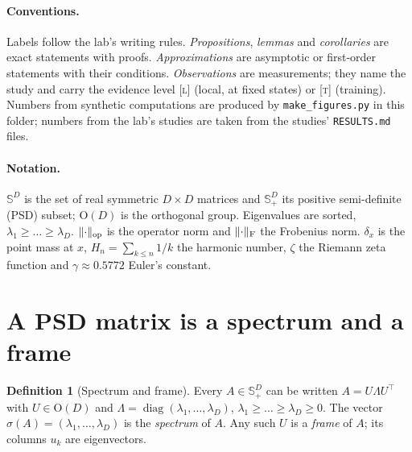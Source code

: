 \documentclass[11pt,a4paper]{article}
\newcommand{\Orth}{\mathrm{O}}
\newcommand{\Sym}{\mathbb{S}}
\DeclareMathOperator{\diag}{diag}
\DeclarePairedDelimiter{\norm}{\lVert}{\rVert}
\newcommand{\op}{\mathrm{op}}
\newcommand{\F}{\mathrm{F}}
\newcommand{\evL}{\textsc{[l]}}
\theoremstyle{plain}
\theoremstyle{definition}
\newtheorem{definition}[proposition]{Definition}
\theoremstyle{remark}
\begin{document}
\paragraph{Conventions.}
Labels follow the lab's writing rules. \emph{Propositions}, \emph{lemmas} and \emph{corollaries} are exact
statements with proofs. \emph{Approximations} are asymptotic or first-order statements with their conditions.
\emph{Observations} are measurements; they name the study and carry the evidence level \evL{} (local, at fixed
states) or \textsc{[t]} (training). Numbers from synthetic computations are produced by \texttt{make\_figures.py} in
this folder; numbers from the lab's studies are taken from the studies' \texttt{RESULTS.md} files.

\paragraph{Notation.}
$\Sym^D$ is the set of real symmetric $D\times D$ matrices and $\Sym^D_+$ its positive semi-definite (PSD) subset;
$\Orth(D)$ is the orthogonal group. Eigenvalues are sorted, $\lambda_1\ge\dots\ge\lambda_D$. $\norm{\cdot}_\op$ is
the operator norm and $\norm{\cdot}_\F$ the Frobenius norm. $\delta_x$ is the point mass at $x$, $H_n=\sum_{k\le
n}1/k$ the harmonic number, $\zeta$ the Riemann zeta function and $\gamma\approx0.5772$ Euler's constant.

\section{A PSD matrix is a spectrum and a frame}\label{sec:frame}

\begin{definition}[Spectrum and frame]
Every $A\in\Sym^D_+$ can be written $A=U\Lambda U^\top$ with $U\in\Orth(D)$ and
$\Lambda=\diag(\lambda_1,\dots,\lambda_D)$, $\lambda_1\ge\dots\ge\lambda_D\ge0$. The vector
$\sigma(A)=(\lambda_1,\dots,\lambda_D)$ is the \emph{spectrum} of $A$. Any such $U$ is a \emph{frame} of $A$; its
columns $u_k$ are eigenvectors.
\end{definition}
\end{document}
